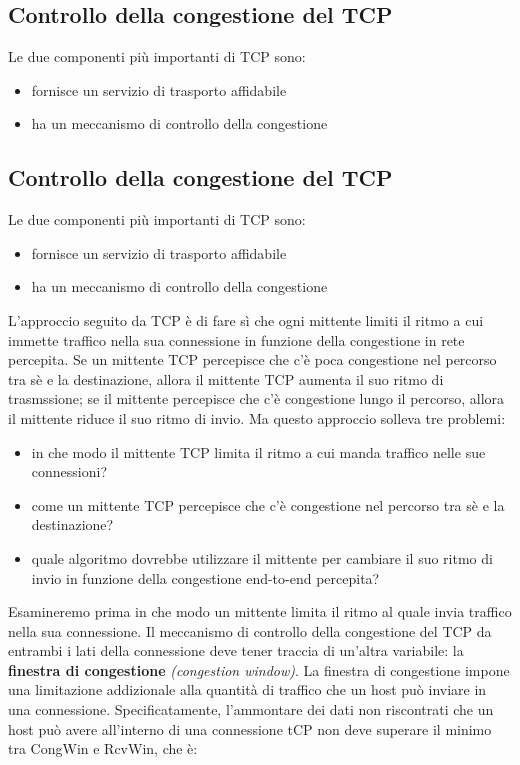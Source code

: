 \documentclass[11pt,a4paper]{article}
\begin{document}
\subsection{Controllo della congestione del TCP}
Le due componenti più importanti di TCP sono:
\begin{itemize}
	\item fornisce un servizio di trasporto affidabile
	\item ha un meccanismo di controllo della congestione
\end{itemize}
\subsection{Controllo della congestione del TCP}
Le due componenti più importanti di TCP sono:
\begin{itemize}
	\item fornisce un servizio di trasporto affidabile
	\item ha un meccanismo di controllo della congestione
\end{itemize}
L'approccio seguito da TCP è di fare sì che ogni mittente limiti il ritmo a cui immette traffico nella sua connessione in funzione della congestione in rete percepita. Se un mittente TCP percepisce che c'è poca congestione nel percorso tra sè e la destinazione, allora il mittente TCP aumenta il suo ritmo di trasmssione; se il mittente percepisce che c'è congestione lungo il percorso, allora il mittente riduce il suo ritmo di invio. Ma questo approccio solleva tre problemi:
\begin{itemize}
	\item in che modo il mittente TCP limita il ritmo a cui manda traffico nelle sue connessioni?
	\item come un mittente TCP percepisce che c'è congestione nel percorso tra sè e la destinazione?
	\item quale algoritmo dovrebbe utilizzare il mittente per cambiare il suo ritmo di invio in funzione della congestione end-to-end percepita?
\end{itemize}
Esamineremo prima in che modo un mittente limita il ritmo al quale invia traffico nella sua connessione. Il meccanismo di controllo della congestione del TCP da entrambi i lati della connessione deve tener traccia di un'altra variabile: la \textbf{finestra di congestione} \textit{(congestion window)}. La finestra di congestione impone una limitazione addizionale alla quantità di traffico che un host può inviare in una connessione. Specificatamente, l'ammontare dei dati non riscontrati che un host può avere all'interno di una connessione tCP non deve superare il minimo tra CongWin e RcvWin, che è:
\end{document}
